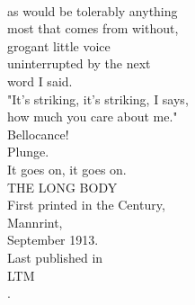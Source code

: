 \documentclass[smalldemyvopaper,11pt,twoside,onecolumn,openright,extrafontsizes]{memoir}
\begin{document}
\\as would be tolerably anything
\\most that comes from without,
\\grogant little voice
\\uninterrupted by the next
\\word I said.
\\"It's striking, it's striking, I says,
\\how much you care about me."
\\Bellocance!
\\Plunge.
\\It goes on, it goes on.
\\THE LONG BODY
\\First printed in the Century,
\\Mannrint,
\\September 1913.
\\Last published in
\\LTM
\\.
\end{document}
